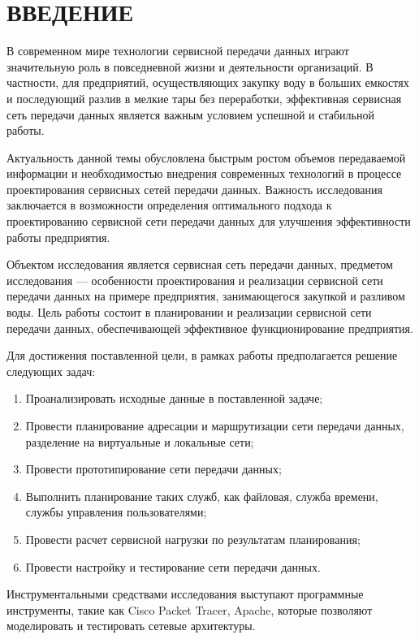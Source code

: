 \clearpage
\section*{ВВЕДЕНИЕ}
В современном мире технологии сервисной передачи данных играют значительную роль в повседневной жизни и деятельности организаций. В частности, для предприятий, осуществляющих закупку воду в больших емкостях и последующий разлив в мелкие тары без переработки, эффективная сервисная сеть передачи данных является важным условием успешной и стабильной работы.

Актуальность данной темы обусловлена быстрым ростом объемов передаваемой информации и необходимостью внедрения современных технологий в процессе проектирования сервисных сетей передачи данных. Важность исследования заключается в возможности определения оптимального подхода к проектированию сервисной сети передачи данных для улучшения эффективности работы предприятия.

Объектом исследования является сервисная сеть передачи данных, предметом исследования --- особенности проектирования и реализации сервисной сети передачи данных на примере предприятия, занимающегося закупкой и разливом воды. Цель работы состоит в планировании и реализации сервисной сети передачи данных, обеспечивающей эффективное функционирование предприятия.

Для достижения поставленной цели, в рамках работы предполагается решение следующих задач:

\begin{enumerate}
        \item Проанализировать исходные данные в поставленной задаче;
        \item Провести планирование адресации и маршрутизации сети передачи данных, разделение на виртуальные и локальные сети;
        \item Провести прототипирование сети передачи данных;
        \item Выполнить планирование таких служб, как файловая, служба времени, службы управления пользователями;
		\item Провести расчет сервисной нагрузки по результатам планирования;
        \item Провести настройку и тестирование сети передачи данных.
\end{enumerate}

Инструментальными средствами исследования выступают программные инструменты, такие как Cisco Packet Tracer, Apache, которые позволяют моделировать и тестировать сетевые архитектуры.

